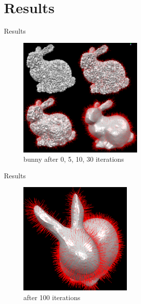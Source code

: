 \documentclass{beamer}
\begin{document}

\section{Results}

\begin{frame}{Results}
\begin{figure}[htb]
\centering
\includegraphics[width=0.55\textwidth]{bunnies_1_10_30_raw.PNG}
\caption{bunny after 0, 5, 10, 30 iterations}
\label{fig:bunny0_1_10_30}
\end{figure}
\end{frame}

\begin{frame}{Results}
\begin{figure}[htb]
\centering
\includegraphics[width=0.5\textwidth]{bunny100.PNG}
\caption{after 100 iterations}
\label{fig:prescribed}
\end{figure}
\end{frame}
\end{document}
